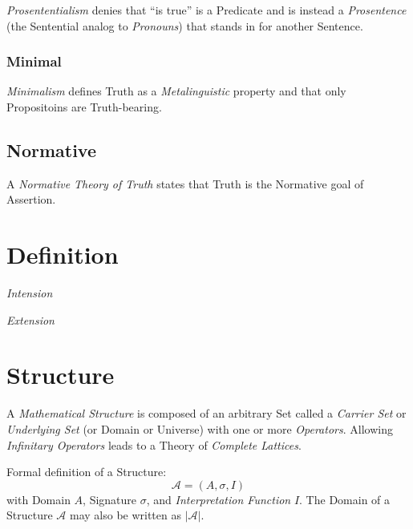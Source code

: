\documentclass{article}
\begin{document}
\emph{Prosententialism} denies that ``is true'' is a Predicate and is
instead a \emph{Prosentence} (the Sentential analog to
\emph{Pronouns}) that stands in for another Sentence.

\subsubsection{Minimal}

\emph{Minimalism} defines Truth as a \emph{Metalinguistic} property
and that only Propositoins are Truth-bearing.

\subsection{Normative}

A \emph{Normative Theory of Truth} states that Truth is the Normative
goal of Assertion.



\section{Definition}\label{sec:semantic_definition}

\emph{Intension}

\emph{Extension}



\section{Structure}\label{sec:mathematical_structure}

A \emph{Mathematical Structure} is composed of an arbitrary Set called
a \emph{Carrier Set} or \emph{Underlying Set} (or Domain or Universe)
with one or more \emph{Operators}. Allowing \emph{Infinitary
  Operators} leads to a Theory of \emph{Complete Lattices}.

Formal definition of a Structure:
\[
    \mathcal{A} = (A, \sigma, I)
\]
with Domain $A$, Signature $\sigma$, and \emph{Interpretation
  Function} $I$. The Domain of a Structure $\mathcal{A}$ may also be
written as $|\mathcal{A}|$.
\end{document}
